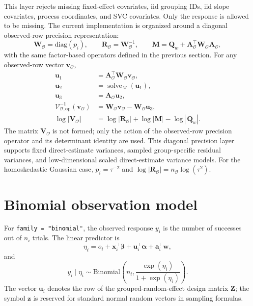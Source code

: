 \documentclass[11pt]{article}
\newcommand{\bw}{\bm{w}}
\newcommand{\balpha}{\bm{\alpha}}
\newcommand{\bbeta}{\bm{\beta}}
\newcommand{\bz}{\bm{z}}
\newcommand{\bu}{\bm{u}}
\newcommand{\bv}{\bm{v}}
\newcommand{\ba}{\bm{a}}
\newcommand{\bx}{\bm{x}}
\newcommand{\bA}{\bm{A}}
\newcommand{\bM}{\bm{M}}
\newcommand{\bQ}{\bm{Q}}
\newcommand{\bR}{\bm{R}}
\newcommand{\bV}{\bm{V}}
\newcommand{\bW}{\bm{W}}
\newcommand{\bZ}{\bm{Z}}
\newcommand{\trans}{^\top}
\begin{document}
This layer rejects missing fixed-effect covariates, iid grouping IDs, iid slope covariates, process coordinates, and SVC covariates. Only the response is allowed to be missing. The current implementation is organized around a diagonal observed-row precision representation:
\begin{equation}
  \bW_{\mathcal{O}} = \mathrm{diag}(p_i),\qquad
  \bR_{\mathcal{O}} = \bW_{\mathcal{O}}^{-1},\qquad
  \bM = \bQ_w + \bA_{\mathcal{O}}\trans \bW_{\mathcal{O}} \bA_{\mathcal{O}},
\end{equation}
with the same factor-based operators defined in the previous section. For any observed-row vector $\bv_{\mathcal{O}}$,
\begin{equation}
\begin{aligned}
  \bu_1 &= \bA_{\mathcal{O}}\trans \bW_{\mathcal{O}}\bv_{\mathcal{O}},\\
  \bu_2 &= \operatorname{solve}_M(\bu_1),\\
  \bu_3 &= \bA_{\mathcal{O}}\bu_2,\\
  \mathcal{V}^{-1}_{\mathcal{O},\mathrm{op}}(\bv_{\mathcal{O}})
    &= \bW_{\mathcal{O}}\bv_{\mathcal{O}} - \bW_{\mathcal{O}}\bu_3,\\
  \log|\bV_{\mathcal{O}}|
    &= \log|\bR_{\mathcal{O}}| + \log|\bM| - \log|\bQ_w|.
\end{aligned}
\end{equation}
The matrix $\bV_{\mathcal{O}}$ is not formed; only the action of the observed-row precision operator and its determinant identity are used. This diagonal precision layer supports fixed direct-estimate variances, sampled group-specific residual variances, and low-dimensional scaled direct-estimate variance models. For the homoskedastic Gaussian case, $p_i=\tau^{-2}$ and $\log|\bR_{\mathcal{O}}| = n_{\mathcal{O}}\log(\tau^2)$.

\section{Binomial observation model}

For \texttt{family = "binomial"}, the observed response $y_i$ is the number of successes out of $n_i$ trials. The linear predictor is
\begin{equation}
  \eta_i = o_i + \bx_i\trans \bbeta + \bu_i\trans \balpha
    + \ba_i\trans \bw,
\end{equation}
and
\begin{equation}
  y_i \mid \eta_i \sim \mathrm{Binomial}
  \left(n_i,\frac{\exp(\eta_i)}{1+\exp(\eta_i)}\right).
\end{equation}
The vector $\bu_i$ denotes the row of the grouped-random-effect design matrix $\bZ$; the symbol $\bz$ is reserved for standard normal random vectors in sampling formulas.
\end{document}
